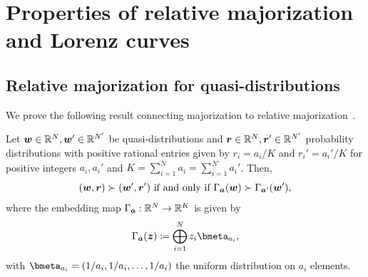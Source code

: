 \documentclass[pra,
aps,
twocolumn,
superscriptaddress,
groupedaddress,
nofootinbib,
reprint
]{revtex4-1}
\begin{document}
\section{Properties of relative majorization and Lorenz curves}
\label{app:major}

\subsection{Relative majorization for quasi-distributions}
\label{app:rel_quasi}

We prove the following result connecting majorization to relative majorization~\cite{cit:horodecki2013, Brandao_2015,  cit:lostaglio}.
\begin{proposition}\label{relmaj2maj}
	Let $\boldsymbol{w} \in \mathbb{R}^N, \boldsymbol{w}' \in \mathbb{R}^{N'}$ be quasi-distributions and $\boldsymbol{r} \in \mathbb{R}^N, \boldsymbol{r}' \in \mathbb{R}^{N'}$ probability distributions with positive rational entries given by $r_i = a_i/K$ and $r_i' = a_i'/K$ for positive integers $a_i, a_i'$ and $K = \sum_{i=1}^N a_i = \sum_{i=1}^{N'} a_i'$. 
Then,
\begin{equation}
(\boldsymbol{w}, \boldsymbol{r}) \succ (\boldsymbol{w}', \boldsymbol{r}') \mbox{ if and only if } \Gamma_{\bm{a}} (\boldsymbol{w}) \succ \Gamma_{\bm{a}'} (\boldsymbol{w}'),
\end{equation}
where the embedding map $\Gamma_{\bm{a}} :\mathbb{R}^N \rightarrow \mathbb{R}^K$ is given by
\begin{equation}
	\Gamma_{\bma}(\bmz) \coloneqq \bigoplus_{i=1}^N z_i \bmeta_{a_i},
\end{equation}
with $\bmeta_{a_i} = (1/a_i, 1/a_i, \dots, 1/a_i)$ the uniform distribution on $a_i$ elements.
\end{proposition}
\end{document}

